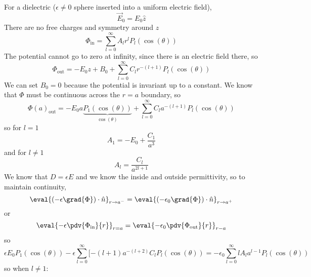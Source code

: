 \documentclass[a4paper,twoside,master.tex]{subfiles}
\begin{document}
\begin{ex}
    For a dielectric ($ \epsilon \neq 0 $  sphere inserted into a uniform electric field),
    \begin{equation}
        \vec{E}_0 = E_0 \hat{z}
    \end{equation}
    There are no free charges and symmetry around $z$
    \begin{equation}
        \Phi_{\text{in}} = \sum_{l=0}^{\infty} A_l r^l P_l( \cos(\theta) )
    \end{equation}
    The potential cannot go to zero at infinity, since there is an electric field there, so
    \begin{equation}
        \Phi_{\text{out}} = -E_0 z + B_0 + \sum_{l=0}^{\infty} C_l r^{-(l+1)} P_l( \cos(\theta) )
    \end{equation}
    We can set $B_0 = 0$ because the potential is invariant up to a constant. We know that $\Phi$ must be continuous across the $r = a $ boundary, so
    \begin{equation}
        \Phi(a)_{\text{out}} = - E_0 a \underbrace{P_1( \cos(\theta) )}_{ \cos(\theta) } + \sum_{l=0}^{\infty} C_l a^{-(l+1)} P_l( \cos(\theta) )
    \end{equation}
    so for $l = 1 $
    \begin{equation}
        A_1 = -E_0 + \frac{C_1}{a^3}
    \end{equation}
    and for $l \neq 1 $
    \begin{equation}
        A_l = \frac{C_l}{a^{2l+1}}
    \end{equation}
    We know that $D = \epsilon E$ and we know the inside and outside permittivity, so to maintain continuity,
    \begin{equation}
        \eval{(- \epsilon \grad{\Phi} ) \cdot \hat{n}}_{r \to a^-} = \eval{(- \epsilon_0 \grad{\Phi} ) \cdot \hat{n}}_{r \to a^+}
    \end{equation}
    or
    \begin{equation}
        \eval{- \epsilon \pdv{\Phi_{\text{in}}}{r}}_{r = a} = \eval{- \epsilon_0 \pdv{\Phi_{\text{out}}}{r}}_{r - a}
    \end{equation}
    so
    \begin{equation}
        \epsilon E_0 P_1(\cos(\theta)) - \epsilon \sum_{l=0}^{\infty} [ -(l+1) a^{-(l+2)} C_l P_l(\cos(\theta) ) = - \epsilon_0 \sum_{l=0}^{\infty} l A_l a^{l-1} P_l(\cos(\theta) )
    \end{equation}
    so when $l \neq 1$:
    \begin{equation}

\end{equation}
\end{ex}
\end{document}
